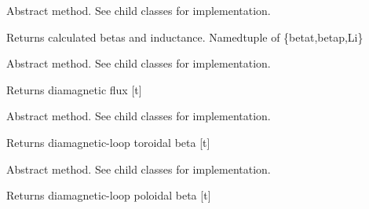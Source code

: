 \documentclass[letterpaper,10pt,english]{sphinxmanual}
\begin{document}
\begin{fulllineitems}
\begin{fulllineitems}
\end{fulllineitems}


\begin{fulllineitems}
\label{\detokenize{eqtools:eqtools.core.Equilibrium.getBetas}}
Abstract method.  See child classes for implementation.

Returns calculated betas and inductance.
Namedtuple of \{betat,betap,Li\}

\end{fulllineitems}


\begin{fulllineitems}
\label{\detokenize{eqtools:eqtools.core.Equilibrium.getDiamagFlux}}
Abstract method.  See child classes for implementation.

Returns diamagnetic flux {[}t{]}

\end{fulllineitems}


\begin{fulllineitems}
\label{\detokenize{eqtools:eqtools.core.Equilibrium.getDiamagBetaT}}
Abstract method.  See child classes for implementation.

Returns diamagnetic-loop toroidal beta {[}t{]}

\end{fulllineitems}


\begin{fulllineitems}
\label{\detokenize{eqtools:eqtools.core.Equilibrium.getDiamagBetaP}}
Abstract method.  See child classes for implementation.

Returns diamagnetic-loop poloidal beta {[}t{]}


\end{fulllineitems}
\end{fulllineitems}
\end{document}
